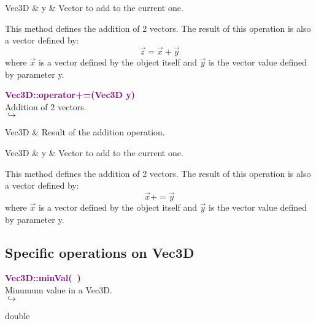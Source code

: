 \begin{tcolorbox}[width=\textwidth,myArgs,tabularx={ll|R}]
Vec3D & y & Vector to add to the current one.
\end{tcolorbox}

This method defines the addition of 2 vectors.
The result of this operation is also a vector defined by:
\begin{equation*}
\overrightarrow{z} = \overrightarrow{x} + \overrightarrow{y}
\end{equation*}
where $\overrightarrow{x}$ is a vector defined by the object itself and $\overrightarrow{y}$ is the vector value defined by parameter y.

\textcolor{purple}{\textbf{Vec3D::operator+=(Vec3D y)}}\label{Vec3D::operator+=(Vec3D y)}\\
Addition of 2 vectors.\\ \hspace*{5mm}$\hookrightarrow$
\vspace*{-2em}\begin{tcolorbox}[grow to left by=-1cm, width=\textwidth-1cm,myArgs,tabularx={l|R}]
Vec3D & Result of the addition operation.
\end{tcolorbox}

\begin{tcolorbox}[width=\textwidth,myArgs,tabularx={ll|R}]
Vec3D & y & Vector to add to the current one.
\end{tcolorbox}

This method defines the addition of 2 vectors.
The result of this operation is also a vector defined by:
\begin{equation*}
\overrightarrow{x} += \overrightarrow{y}
\end{equation*}
where $\overrightarrow{x}$ is a vector defined by the object itself and $\overrightarrow{y}$ is the vector value defined by parameter y.

\subsection{Specific operations on Vec3D}

\textcolor{purple}{\textbf{Vec3D::minVal(~)}}\label{Vec3D::minVal()}\\
Minumum value in a Vec3D.\\ \hspace*{5mm}$\hookrightarrow$
\vspace*{-2em}\begin{tcolorbox}[grow to left by=-1cm, width=\textwidth-1cm,myArgs,tabularx={l|R}]
double
\end{tcolorbox}

